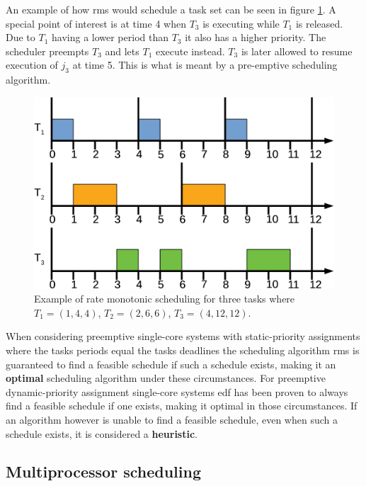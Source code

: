 \documentclass{kththesis}
\begin{document}
An example of how \acrshort{rms} would schedule a task set can be seen in figure
\ref{fig:rate_monotonic_scheduling}. A special point of interest is at time 4 when $T_3$ is
executing while $T_1$ is released. Due to $T_1$ having a lower period than $T_3$ it also has a
higher priority. The scheduler preempts $T_3$ and lets $T_1$ execute instead. $T_3$ is later allowed
to resume execution of $j_3$ at time 5. This is what is meant by a pre-emptive scheduling algorithm.

\begin{figure}

    \centering

    \includegraphics[width=0.8\linewidth]{images/rate-monotonic-scheduling.pdf}

    \caption{Example of rate monotonic scheduling for three tasks where $T_1=(1, 4, 4)$, $T_2=(2, 6,
    6)$, $T_3=(4, 12, 12)$.}

    \label{fig:rate_monotonic_scheduling}

\end{figure}

When considering preemptive single-core systems with static-priority assignments where the tasks
periods equal the tasks deadlines the scheduling algorithm \acrshort{rms} is guaranteed to find a
feasible schedule if such a schedule exists, making it an \textbf{optimal} scheduling algorithm
under these circumstances. For preemptive dynamic-priority assignment single-core systems
\acrshort{edf} has been proven to always find a feasible schedule if one exists, making it optimal
in those circumstances. If an algorithm however is unable to find a feasible schedule, even when
such a schedule exists, it is considered a \textbf{heuristic}.

\subsection{Multiprocessor scheduling} \label{subsec:multiprocessor_scheduling}
\end{document}
